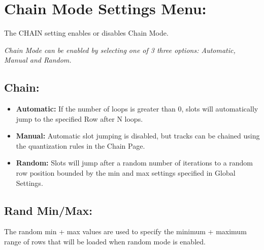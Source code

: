 \chapter{Chain Mode Settings Menu:}
The CHAIN setting enables or disables Chain Mode.


\textit{Chain Mode can be enabled by selecting one of 3 three options: Automatic, Manual and Random.}
\\
\section{Chain:}
\begin{itemize}
\item \textbf{Automatic:} If the number of loops is greater than 0, slots will automatically jump to the specified Row after N loops.
\item \textbf{Manual:} Automatic slot jumping is disabled, but tracks can be chained using the quantization rules in the Chain Page.
\item \textbf{Random:} Slots will jump after a random number of iterations to a random row position bounded by the min and max settings specified in Global Settings.
\end{itemize}
\section{Rand Min/Max:} The random min + max values are used to specify the minimum + maximum range of rows that will be loaded when random mode is enabled.
